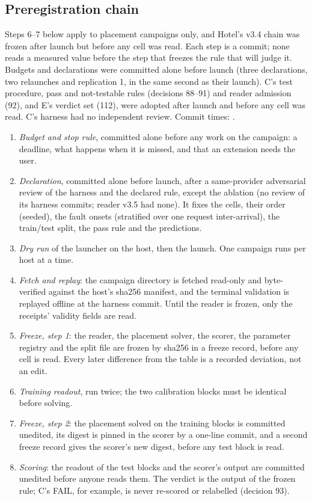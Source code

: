 \documentclass{ceurart}
\begin{document}
\subsection{Preregistration chain}\label{sec:prereg}
Steps 6--7 below apply to placement campaigns only, and Hotel's v3.4 chain was frozen
after launch but before any cell was read. Each step is a commit; none reads a measured value before the step
that freezes the rule that will judge it. Budgets and declarations were committed alone before launch (three
declarations, two relaunches and replication 1, in the same second as their launch). C's test procedure, pass and
not-testable rules (decisions 88--91) and reader admission (92), and E's verdict set (112), were adopted after launch
and before any cell was read. C's harness had no independent review. Commit times: .
\begin{enumerate}
\item \emph{Budget and stop rule}, committed alone before any work on the campaign: a deadline, what happens when it is
  missed, and that an extension needs the user.
\item \emph{Declaration}, committed alone before launch, after a same-provider adversarial review of the harness and
  the declared rule, except the ablation (no review of its harness commits; reader v3.5 had none). It fixes the cells, their order (seeded), the fault onsets (stratified over one request inter-arrival), the
  train/test split, the pass rule and the predictions.
\item \emph{Dry run} of the launcher on the host, then the launch. One campaign runs per host at a time.
\item \emph{Fetch and replay}: the campaign directory is fetched read-only and byte-verified against the host's sha256
  manifest, and the terminal validation is replayed offline at the harness commit. Until the reader is frozen, only the
  receipts' validity fields are read.
\item \emph{Freeze, step 1}: the reader, the placement solver, the scorer, the parameter registry and the split file are
  frozen by sha256 in a freeze record, before any cell is read. Every later difference from the table is a recorded
  deviation, not an edit.
\item \emph{Training readout}, run twice; the two calibration blocks must be identical before solving.
\item \emph{Freeze, step 2}: the placement solved on the training blocks is committed unedited, its digest is pinned in
  the scorer by a one-line commit, and a second freeze record gives the scorer's new digest, before any test block is
  read.
\item \emph{Scoring}: the readout of the test blocks and the scorer's output are committed unedited before anyone reads
  them. The verdict is the output of the frozen rule; C's FAIL, for example, is never re-scored or relabelled (decision 93).
\end{enumerate}
\end{document}
